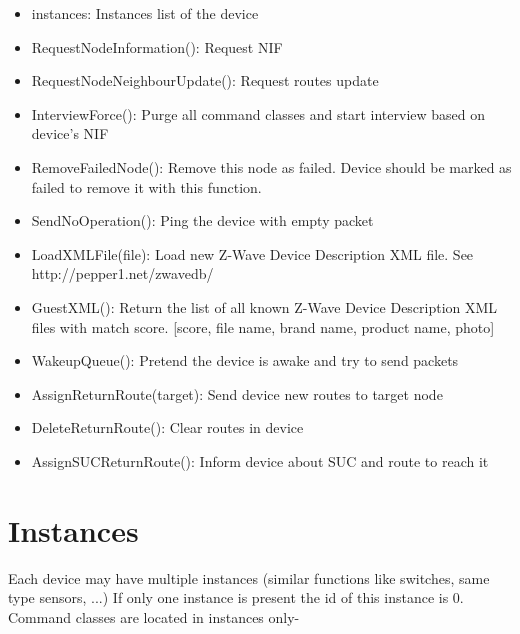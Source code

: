 \begin {itemize}
\begin {itemize}
\begin {itemize}
\item neightbours: list of neighbour nodes
\item nodeInfoFrame: nodeinformation frame in bytes
\item option: flag if optional command classes are present
\item queueLength: length of device specific send queue
\item sensor1000: flag if device is FLIRS with 1000 ms wakeup 
\item sensor250: flag if device is FLIRS with 250 ms wakeup 
\item specificType: specific Z-Wave device class
\end {itemize}
\item instances: Instances list of the device
\item RequestNodeInformation(): Request NIF
\item RequestNodeNeighbourUpdate(): Request routes update
\item InterviewForce(): Purge all command classes and start interview based on device's NIF
\item RemoveFailedNode(): Remove this node as failed. Device should be marked as failed to remove it with this function.
\item SendNoOperation(): Ping the device with empty packet
\item LoadXMLFile(file): Load new Z-Wave Device Description XML file. See http://pepper1.net/zwavedb/
\item GuestXML(): Return the list of all known Z-Wave Device Description XML files with match score. [score, file name, brand name, product name, photo]
\item WakeupQueue(): Pretend the device is awake and try to send packets
\item AssignReturnRoute(target): Send device new routes to target node
\item DeleteReturnRoute(): Clear routes in device
\item AssignSUCReturnRoute(): Inform device about SUC and route to reach it
\end {itemize}
\end {itemize}

\section{Instances}

Each device may have multiple instances (similar functions like switches, same type sensors, ...) If only one instance 
is present the id of this instance is 0. Command classes are located in instances only-

